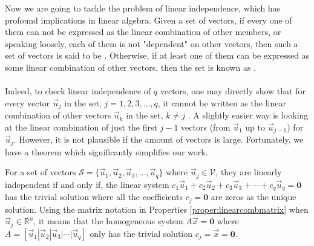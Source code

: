 Now we are going to tackle the problem of linear independence, which has profound implications in linear algebra. Given a set of vectors, if every one of them can not be expressed as the linear combination of other members, or speaking loosely, each of them is not "dependent" on other vectors, then such a set of vectors is said to be . Otherwise, if at least one of them can be expressed as some linear combination of other vectors, then the set is known as .\\
\\
Indeed, to check linear independence of $q$ vectors, one may directly show that for every vector $\vec{u}_j$ in the set, $j = 1,2,3,\ldots,q$, it cannot be written as the linear combination of other vectors $\vec{u}_k$ in the set, $k \neq j$ . A slightly easier way is looking at the linear combination of just the first $j-1$ vectors (from $\vec{u}_1$ up to $\vec{u}_{j-1}$) for $\vec{u}_j$. However, it is not plausible if the amount of vectors is large. Fortunately, we have a theorem which significantly simplifies our work.
\begin{thm}
\label{thm:linearindep}
For a set of vectors $\mathcal{S} = \{\vec{u}_1, \vec{u}_2, \vec{u}_3, \ldots, \vec{u}_q\}$ where $\vec{u}_j \in \mathcal{V}$, they are linearly independent if and only if, the linear system $c_1\vec{u}_1 + c_2\vec{u}_2 + c_3\vec{u}_3 + \cdots + c_q\vec{u}_q = \textbf{0}$ has the trivial solution where all the coefficients $c_j = \textbf{0}$ are zeros as the unique solution. Using the matrix notation in Properties \ref{proper:linearcombmatrix} when $\vec{u}_j \in \mathbb{R}^n$, it means that the homogeneous system $A\vec{x} = \textbf{0}$ where $A = [\vec{u}_1|\vec{u}_2|\vec{u}_3|\cdots|\vec{u}_q]$ only has the trivial solution $c_j = \vec{x} = \textbf{0}$.
\end{thm}
